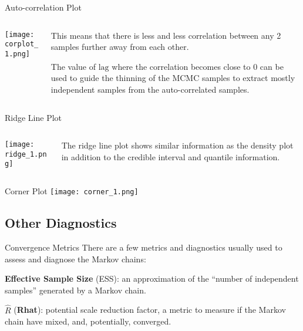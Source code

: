 \begin{frame}{Auto-correlation Plot}
    \begin{columns}
        \begin{column}{0.5\textwidth}
            \centering
            \texttt{[image: corplot\_1.png]}
        \end{column}
        \begin{column}{0.5\textwidth}
            \begin{vfilleditems}
                \item This means that there is less and less correlation between any 2 samples further away from each other.
                \item The value of $\text{lag}$ where the correlation becomes close to 0 can be used to guide the thinning of the MCMC samples to extract mostly independent samples from the auto-correlated samples.
            \end{vfilleditems}
        \end{column}
    \end{columns}
\end{frame}

\begin{frame}{Ridge Line Plot}
    \begin{columns}
        \begin{column}{0.5\textwidth}
            \centering
            \texttt{[image: ridge\_1.png]}
        \end{column}
        \begin{column}{0.5\textwidth}
            The ridge line plot shows similar information as the density plot in addition to the credible interval and quantile information.
        \end{column}
    \end{columns}
\end{frame}

\begin{frame}{Corner Plot}
    \centering
    \texttt{[image: corner\_1.png]}
\end{frame}

\subsection{Other Diagnostics}
\begin{frame}{Convergence Metrics}
    There are a few metrics and diagnostics usually used to assess and diagnose the Markov chains:
    \begin{vfilleditems}
        \item \textbf{Effective Sample Size} (ESS):
        an approximation of the ``number of independent samples'' generated by a Markov chain.
        \item $\widehat{R}$ (\textbf{Rhat}):
        potential scale reduction factor,
        a metric to measure if the Markov chain have mixed,
        and, potentially, converged.
    \end{vfilleditems}
\end{frame}

